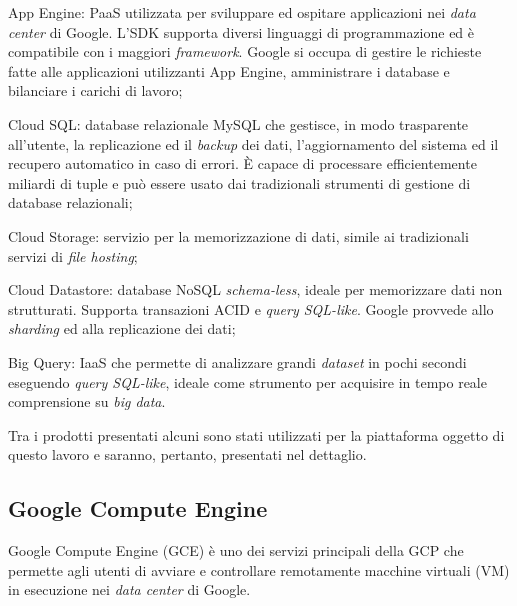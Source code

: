 App Engine: PaaS utilizzata per sviluppare ed ospitare applicazioni nei \textit{data center} di Google. L’SDK supporta diversi linguaggi di programmazione ed è compatibile con i 
maggiori \textit{framework}. Google si occupa di gestire le richieste fatte alle applicazioni utilizzanti App Engine, amministrare i database e bilanciare i carichi di lavoro;

Cloud SQL: database relazionale MySQL che gestisce, in modo trasparente all’utente, la replicazione ed il \textit{backup} dei dati, l’aggiornamento del sistema ed il recupero automatico 
in caso di errori. È capace di processare efficientemente miliardi di tuple e può essere usato dai tradizionali strumenti di gestione di database relazionali;

Cloud Storage: servizio per la memorizzazione di dati, simile ai tradizionali servizi di \textit{file hosting};

Cloud Datastore: database NoSQL \textit{schema-less}, ideale per memorizzare dati non strutturati. Supporta transazioni ACID e \textit{query SQL-like}. Google provvede allo \textit{sharding} ed alla 
replicazione dei dati;

Big Query: IaaS che permette di analizzare grandi \textit{dataset} in pochi secondi eseguendo \textit{query SQL-like}, ideale come strumento per acquisire in tempo reale comprensione su \textit{big data}.

Tra i prodotti presentati alcuni sono stati utilizzati per la piattaforma oggetto di questo lavoro e saranno, pertanto, presentati nel dettaglio.


\subsection{Google Compute Engine}
\label{par:GCE}

Google Compute Engine (GCE) è uno dei servizi principali della GCP che permette agli utenti di avviare e controllare remotamente macchine virtuali (VM) in esecuzione nei 
\textit{data center} di Google.

